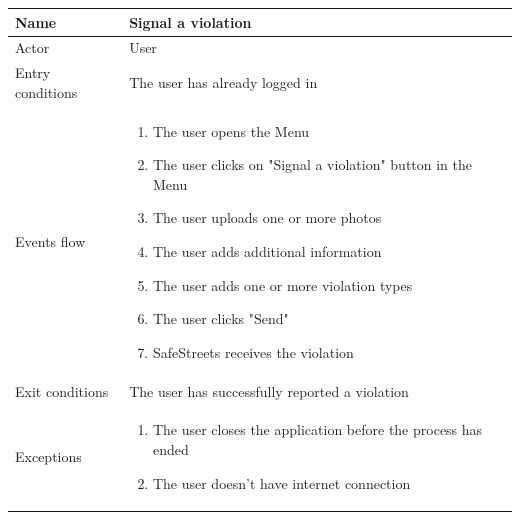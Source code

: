 \documentclass{article}
\begin{document}
\begin{table}[H]
    \begin{tabular}{|l|l|}
    \hline
    Name & \begin{minipage}[t]{0.7\textwidth} \textbf{Signal a violation}\end{minipage}
    \\ \hline  
    Actor & \begin{minipage}[t]{0.7\textwidth} User\end{minipage} \\ \hline 
    Entry conditions & \begin{minipage}[t]{0.7\textwidth} The user has already
    logged in \end{minipage} \\ \hline 
    Events flow & \begin{minipage}[t]{0.7\textwidth}
    \begin{enumerate}
        \item The user opens the Menu
        \item The user clicks on "Signal a violation" button in the Menu
        \item The user uploads one or more photos
        \item The user adds additional information
        \item The user adds one or more violation types
        \item The user clicks "Send"
        \item SafeStreets receives the violation
    \end{enumerate}
    \end{minipage} \\ \hline
    Exit conditions & \begin{minipage}[t]{0.7\textwidth}The user has
    successfully reported a violation \end{minipage} \\ \hline
    Exceptions & \begin{minipage}[t]{0.7\textwidth}
    \begin{enumerate}
        \item The user closes the application before the process has ended 
        \item The user doesn't have internet connection 
    \end{enumerate}    
    \end{minipage} \\ \hline
    \end{tabular}
\end{table}
\end{document}
